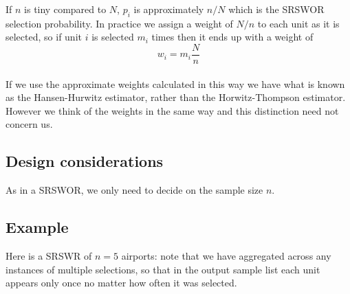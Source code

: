 \documentclass[
]{book}
\newenvironment{Shaded}{\begin{snugshade}}{\end{snugshade}}
\newcommand{\AttributeTok}[1]{\textcolor[rgb]{0.13,0.29,0.53}{#1}}
\newcommand{\ConstantTok}[1]{\textcolor[rgb]{0.56,0.35,0.01}{#1}}
\newcommand{\DecValTok}[1]{\textcolor[rgb]{0.00,0.00,0.81}{#1}}
\newcommand{\FunctionTok}[1]{\textcolor[rgb]{0.13,0.29,0.53}{\textbf{#1}}}
\newcommand{\NormalTok}[1]{#1}
\newcommand{\OtherTok}[1]{\textcolor[rgb]{0.56,0.35,0.01}{#1}}
\newcommand{\SpecialCharTok}[1]{\textcolor[rgb]{0.81,0.36,0.00}{\textbf{#1}}}
\begin{document}
If \(n\) is tiny compared to \(N\), \(p_i\) is approximately \(n/N\) which is the SRSWOR selection
probability. In practice we assign a weight of \(N/n\) to each unit as it is selected, so if unit
\(i\) is selected \(m_i\) times then it ends up with a weight of
\[
   w_i = m_i\frac{N}{n}
\]\\
If we use the approximate weights calculated in this way we have what is known as the
Hansen-Hurwitz estimator, rather than the Horwitz-Thompson estimator. However we think of
the weights in the same way and this distinction need not concern us.

\subsection*{Design considerations}\label{design-considerations-2}

As in a SRSWOR, we only need to decide on the sample size \(n\).

\subsection*{Example}\label{example-2}

Here is a SRSWR of \(n=5\) airports: note that we have aggregated
across any instances of multiple selections, so that in the output
sample list each unit appears only once no matter how often it was selected.

\begin{Shaded}
\end{Shaded}
\end{document}
